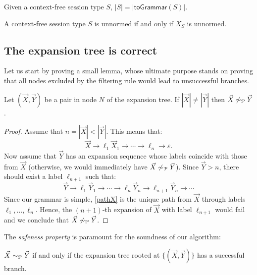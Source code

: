 \begin{corollary}
	Given a context-free session type $S$, $|S| = |\mathsf{toGrammar}(S)|$.
\end{corollary}

\begin{corollary}
	A context-free session type $S$ is unnormed if and only if 
	$X_S$ is unnormed.
\end{corollary}

\subsection{The expansion tree is correct}

Let us start by proving a small lemma, whose ultimate purpose 
stands on proving that all nodes excluded by the filtering rule
would lead to unsuccessful branches.

\begin{lemma}
\label{lemma:filtering}
	Let $(\vec X, \vec Y)$ be a pair in node $N$ of the expansion tree. 
	If $|\vec X| \neq |\vec Y|$ then  $\vec X \not\sim_{\mathcal{P}} \vec Y$.
\end{lemma}

\begin{proof}
	Assume that $n = |\vec X| < |\vec Y|$. This means that:
	\begin{equation}
	\label{pathX}
		\vec X \rightarrow \ell_1 \vec X_1 \rightarrow \cdots 
		\rightarrow \ell_n \rightarrow \varepsilon.
	\end{equation}
	Now assume that $\vec Y$ has an expansion sequence whose 
	labels coincide with those from $\vec X$ (otherwise, we would immediately
	have $\vec X \not\sim_{\mathcal{P}} \vec Y$). Since $\vec Y > n$, there should 
	exist a label $\ell_{n+1}$ such that:
	\[\vec Y \rightarrow \ell_1 \vec Y_1 \rightarrow \cdots 
	\rightarrow \ell_n \vec Y_n\rightarrow \ell_{n+1} \vec Y_n 
	\rightarrow \cdots\]
	Since our grammar is simple, \eqref{pathX} is the unique path from $\vec X$
	through labels $\ell_1, \ldots, \ell_n$. Hence, the $(n+1)$-th expansion of
	$\vec X$ with label $\ell_{n+1}$ would fail and we conclude that
	$\vec X \not\sim_{\mathcal{P}} \vec Y$.
\end{proof}

The \emph{safeness property} is paramount for the soundness of our algorithm:

\begin{proposition} 
\label{prop:safeness}
	$\vec X \sim_{\mathcal{P}} \vec Y$ if and only if the expansion tree rooted 
	at $\{(\vec X, \vec Y)\}$ has a successful branch.
\end{proposition}

